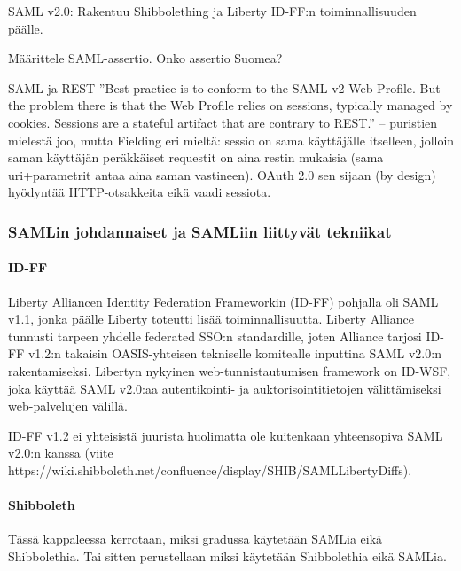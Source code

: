 \documentclass[finnish,gradu]{tktltiki}
\begin{document}


  SAML v2.0: Rakentuu Shibbolething ja Liberty ID-FF:n toiminnallisuuden päälle.

  Määrittele SAML-assertio. Onko assertio Suomea?

  SAML ja REST %
  ''Best practice is to conform to the SAML v2 Web Profile. But the problem there is that the Web Profile relies on sessions, typically managed by cookies. Sessions are a stateful artifact that are contrary to REST.'' -- puristien mielestä joo, mutta Fielding eri mieltä: sessio on sama käyttäjälle itselleen, jolloin saman käyttäjän peräkkäiset requestit on aina restin mukaisia (sama uri+parametrit antaa aina saman vastineen).
  OAuth 2.0 sen sijaan (by design) hyödyntää HTTP-otsakkeita eikä vaadi sessiota.

  \subsubsection{SAMLin johdannaiset ja SAMLiin liittyvät tekniikat} %
  \label{ssub:samlin_johdannaiset}


  \paragraph{ID-FF} %
  \label{par:id_ff}
  Liberty Alliancen Identity Federation Frameworkin (ID-FF) pohjalla oli SAML v1.1, jonka päälle Liberty toteutti lisää toiminnallisuutta.
  Liberty Alliance tunnusti tarpeen yhdelle federated SSO:n standardille, joten Alliance tarjosi ID-FF v1.2:n takaisin OASIS-yhteisen tekniselle komitealle inputtina SAML v2.0:n rakentamiseksi.
  Libertyn nykyinen web-tunnistautumisen framework on ID-WSF, joka käyttää SAML v2.0:aa autentikointi- ja auktorisointitietojen välittämiseksi web-palvelujen välillä.

  ID-FF v1.2 ei yhteisistä juurista huolimatta ole kuitenkaan yhteensopiva SAML v2.0:n kanssa (viite https://wiki.shibboleth.net/confluence/display/SHIB/SAMLLibertyDiffs).


  \paragraph{Shibboleth} %
  \label{par:saml_vs_shibboleth}
  Tässä kappaleessa kerrotaan, miksi gradussa käytetään SAMLia eikä Shibbolethia. Tai sitten perustellaan miksi käytetään Shibbolethia eikä SAMLia.
\end{document}
